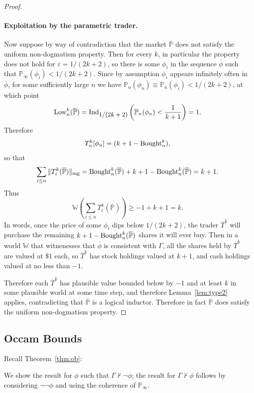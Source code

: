 \documentclass[authordate,onecolumn,noenvironments]{miri-tech-article}
\numberwithin{equation}{subsection}
\newcommand{\seq}[1]{{\overline{#1}}}
\newcommand{\phis}{\seq{\phi}}
\newcommand{\li}{logical inductor}
\newcommand{\trade}{T}%
\newcommand{\Trader}{\seq{\trade}} %
\newcommand{\magnit}[1]{{\|#1\|_{\rm mg}}} %
\newcommand{\BelState}{\mathbb{P}}
\newcommand{\pt}{\BelState}
\newcommand{\MP}{\seq{\pt}}
\newcommand{\World}{\mathbb{W}}
\newcommand{\Theory}{\Gamma}
\newcommand{\amountbought}{{\rm Bought}}
\newcommand{\lowprice}{{\rm Low}}
\newcommand{\ctsind}[1]{\operatorname{Ind}_{\text{\small{${#1}$}}}} %
\begin{document}
\begin{proof}
\paragraph{Exploitation by the parametric trader.}

Now suppose by way of contradiction that the market $\MP$ does not satisfy 
the uniform non-dogmatism property.  Then for every $k$, in particular the property does not hold for $\varepsilon = 1/(2k+2)$, so 
there is some $\phi_i$ in the sequence $\phis$ such that
$\pt_\infty(\phi_i) <  1/(2k+2)$. Since by assumption $\phi_i$ appears infinitely often in $\phis$, for some sufficiently large
$n$ we have $\pt_n(\phi_n) \equiv \pt_n(\phi_i)  <  1/(2k+2)$,  at which point
%
\[\lowprice^k_n(\MP) = \ctsind{1/(2k + 2)} \left(\pt_n(\phi_n) < \frac{1}{k+1}\right)= 1. \]
%
Therefore 
%
\[\trade^k_n[\phi_n] = (k + 1 - \amountbought^k_n),  \]
%
so that 
%
\[\sum_{i\leq  n} \magnit{ \trade^k_i (\MP)} =  \amountbought^k_{n} (\MP)+ k+1- \amountbought^k_{n}(\MP) = k+1. 
\]
%
Thus
%
\[\World\left({\textstyle \sum_{i \leq n} \trade^k_i(\MP) }\right)  \geq  -1 + k+1 = k. \]
%
In words, once the price of some $\phi_i$ dips below $1/(2k+2)$, the trader $\Trader^k$ will purchase the remaining $k+1-\amountbought^k_n(\MP)$ shares it
will ever buy. Then in a world $\World$ that witnenesses that $\phis$ is consistent with $\Theory$, all the shares held by $\Trader^k$ are valued at $\$1$
each, so $\Trader^k$ has stock holdings valued at $k+1$, and cash holdings valued at no less than $-1$. 

Therefore each $\Trader^k$ has plausible value bounded below by $-1$ and at least $k$ in some plausible world at some time step, and therefore 
Lemma~\ref{lem:type2} applies, contradicting that $\MP$ is a \li{}. Therefore in fact 
$\MP$ does satisfy 
the uniform non-dogmatism property. 

\end{proof}






\subsection{Occam Bounds}\label{app:ob}
Recall Theorem~\ref{thm:ob}:

\restateoccam*

We show the result for $\phi$ such that $\Theory \not\vdash \lnot \phi$; the result for $\Theory \not\vdash \phi$ follows by
considering $\lnot\lnot \phi$ and using the coherence of $\pt_\infty$. 
\end{document}
